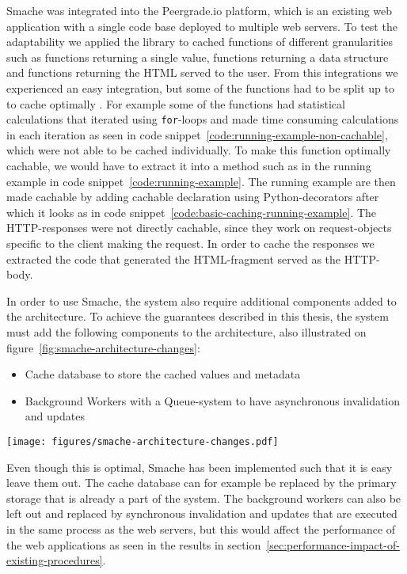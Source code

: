 Smache was integrated into the Peergrade.io platform, which is an existing web application with a single code base deployed to multiple web servers. To test the adaptability we applied the library to cached functions of different granularities such as functions returning a single value, functions returning a data structure and functions returning the HTML served to the user. From this integrations we experienced an easy integration, but some of the functions had to be split up to to cache optimally .
For example some of the functions had statistical calculations that iterated using \verb$for$-loops and made time consuming calculations in each iteration as seen in code snippet~\ref{code:running-example-non-cachable}, which were not able to be cached individually. To make this function optimally cachable, we would have to extract it into a method such as in the running example in code snippet~\ref{code:running-example}. The running example are then made cachable by adding cachable declaration using Python-decorators after which it looks as in code snippet~\ref{code:basic-caching-running-example}.
The HTTP-responses were not directly cachable, since they work on request-objects specific to the client making the request. In order to cache the responses we extracted the code that generated the HTML-fragment served as the HTTP-body.

In order to use Smache, the system also require additional components added to the architecture. To achieve the guarantees described in this thesis, the system must add the following components to the architecture, also illustrated on figure~\ref{fig:smache-architecture-changes}:

\begin{itemize}
  \item Cache database to store the cached values and metadata
  \item Background Workers with a Queue-system to have asynchronous invalidation and updates
\end{itemize}

\begin{figure*}[ht!]
  \centering
  \texttt{[image: figures/smache-architecture-changes.pdf]}
  \caption{Additional architectural components required to use Smache compared to a normal web application including clients, web application servers and a primary storage.}
  \label{fig:smache-architecture-changes}
\end{figure*}

Even though this is optimal, Smache has been implemented such that it is easy leave them out. The cache database can for example be replaced by the primary storage that is already a part of the system. The background workers can also be left out and replaced by synchronous invalidation and updates that are executed in the same process as the web servers, but this would affect the performance of the web applications as seen in the results in section~\ref{sec:performance-impact-of-existing-procedures}.


